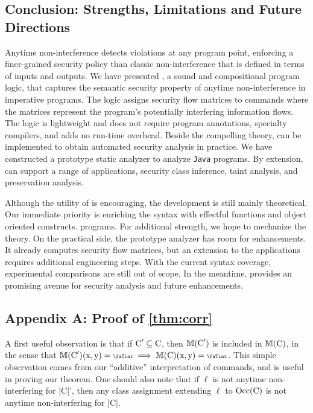 \subsection{Conclusion: Strengths, Limitations and Future Directions}
\label{sec:conclusion}

Anytime non-interference detects violations at any program point, enforcing a
finer-grained security policy than classic non-interference that is defined in
terms of inputs and outputs. We have presented \lname, a sound and compositional
program logic, that captures the semantic security property of anytime
non-interference in imperative programs. The logic assigns security flow
matrices to commands where the matrices represent the program's potentially
interfering information flows. The logic is lightweight and does not require
program annotations, specialty compilers, and adds no run-time overhead. Beside
the compelling theory, \lname can be implemented to obtain automated security
analysis in practice. We have constructed a prototype static analyzer \tool to
analyze \texttt{Java} programs. By extension, \tool can support a range of
applications, \eg security class inference, taint analysis, and preservation
analysis.

Although the utility of \lname is encouraging, the development is still mainly
theoretical. Our immediate priority is enriching the syntax with effectful
functions and object oriented constructs. %
programs. For additional strength, we hope to mechanize the theory. On the
practical side, the prototype analyzer has room for enhancements. It already
computes security flow matrices, but an extension to the applications requires
additional engineering steps. With the current syntax coverage, experimental
comparisons are still out of scope. In the meantime, \lname provides an
promising avenue for security analysis and future enhancements.

\subsection{Appendix A: Proof of \autoref{thm:corr}}\label{app:proof}

A first useful observation is that if \(\prc|C|' \subseteq \prc|C|\), then
\(\sfm{\prc|C|'}\) is included in \(\sfm{\prc|C|}\), in the sense that
\(\sfm{\prc|C|'}(\prc|x|, \prc|y|) = \vi \implies \sfm{\prc|C|}(\prc|x|,
\prc|y|) = \vi\). This simple observation comes from our \enquote{additive}
interpretation of commands, and is useful in proving our theorem. One should
also note that if \(\ell\) is not anytime non-interfering for \prc|C|', then any
class assignment extending \(\ell\) to \(\Occ(\prc|C|)\) is not anytime
non-interfering for \prc|C|.

